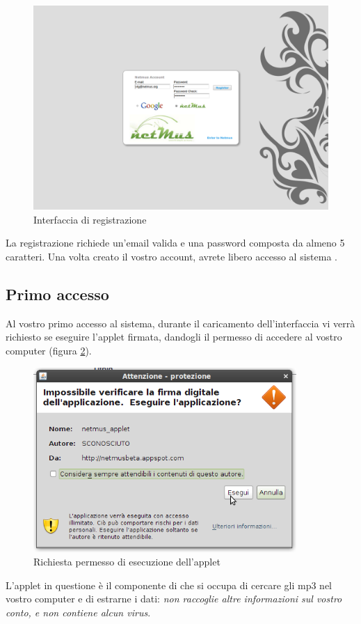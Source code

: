 \begin{figure}[!htbp]
  \centering
  \includegraphics[width=14cm]{img/MU/registration.png}
\caption{Interfaccia di registrazione}
\label{fig:registrazione}
\end{figure}

La registrazione richiede un'email valida e una password composta da almeno 5
caratteri. Una volta creato il vostro account, avrete libero accesso al
sistema .\\

\newpage
\subsection{Primo accesso}

Al vostro primo accesso al sistema, durante il caricamento dell'interfaccia vi
verr\`a richiesto se eseguire l'applet firmata, dandogli il permesso di accedere
al vostro computer (figura \ref{fig:permessiApplet}).
\begin{figure}[!htbp]
  \centering
  \includegraphics[width=10cm]{img/MU/permessi_applet.png}
\caption{Richiesta permesso di esecuzione dell'applet}
\label{fig:permessiApplet}
\end{figure}
L'applet in questione \`e il componente di  che si occupa di cercare
gli mp3 nel vostro computer e di estrarne i dati: \emph{non raccoglie altre
informazioni sul vostro conto, e non contiene alcun virus}.

